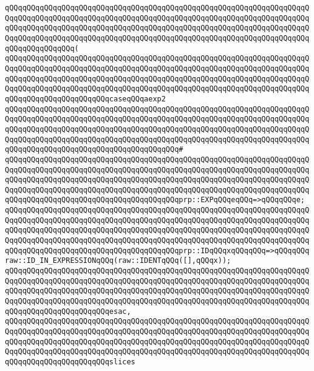\verb|qQQqqQQqqQQqqQQqqQQqqQQqqQQqqQQqqQQqqQQqqQQqqQQqqQQqqQQqqQQqqQQqqQQqqQQqqQQqqQQqqQQqqQQqqQQqqQQqqQQqqQQqqQQqqQQqqQQqqQQqqQQqqQQqqQQqqQQqqQQqqQQqqQQqqQQqqQQqqQQqqQQqqQQqqQQqqQQqqQQqqQQqqQQqqQQqqQQqqQQqqQQqqQQqqQQqqQQqqQQqqQQqqQQqqQQqqQQqqQQqqQQqqQQqqQQqqQQqqQQqqQQqqQQqqQQqqQQqqQQqqQQqqQQqqQQqqQQq(|\newline
\verb|qQQqqQQqqQQqqQQqqQQqqQQqqQQqqQQqqQQqqQQqqQQqqQQqqQQqqQQqqQQqqQQqqQQqqQQqqQQqqQQqqQQqqQQqqQQqqQQqqQQqqQQqqQQqqQQqqQQqqQQqqQQqqQQqqQQqqQQqqQQqqQQqqQQqqQQqqQQqqQQqqQQqqQQqqQQqqQQqqQQqqQQqqQQqqQQqqQQqqQQqqQQqqQQqqQQqqQQqqQQqqQQqqQQqqQQqqQQqqQQqqQQqqQQqqQQqqQQqqQQqqQQqqQQqqQQqqQQqqQQqqQQqqQQqqQQqqQQqqQQqqQQqcaseqQQqaexp2|\newline
\verb|qQQqqQQqqQQqqQQqqQQqqQQqqQQqqQQqqQQqqQQqqQQqqQQqqQQqqQQqqQQqqQQqqQQqqQQqqQQqqQQqqQQqqQQqqQQqqQQqqQQqqQQqqQQqqQQqqQQqqQQqqQQqqQQqqQQqqQQqqQQqqQQqqQQqqQQqqQQqqQQqqQQqqQQqqQQqqQQqqQQqqQQqqQQqqQQqqQQqqQQqqQQqqQQqqQQqqQQqqQQqqQQqqQQqqQQqqQQqqQQqqQQqqQQqqQQqqQQqqQQqqQQqqQQqqQQqqQQqqQQqqQQqqQQqqQQqqQQqqQQqqQQqqQQqqQQqqQQqqQQq#|\newline
\verb|qQQqqQQqqQQqqQQqqQQqqQQqqQQqqQQqqQQqqQQqqQQqqQQqqQQqqQQqqQQqqQQqqQQqqQQqqQQqqQQqqQQqqQQqqQQqqQQqqQQqqQQqqQQqqQQqqQQqqQQqqQQqqQQqqQQqqQQqqQQqqQQqqQQqqQQqqQQqqQQqqQQqqQQqqQQqqQQqqQQqqQQqqQQqqQQqqQQqqQQqqQQqqQQqqQQqqQQqqQQqqQQqqQQqqQQqqQQqqQQqqQQqqQQqqQQqqQQqqQQqqQQqqQQqqQQqqQQqqQQqqQQqqQQqqQQqqQQqqQQqqQQqqQQqqQQqqQQqqQQqprp::EXPqQQqeqQQq=>qQQqqQQqe;|\newline
\verb|qQQqqQQqqQQqqQQqqQQqqQQqqQQqqQQqqQQqqQQqqQQqqQQqqQQqqQQqqQQqqQQqqQQqqQQqqQQqqQQqqQQqqQQqqQQqqQQqqQQqqQQqqQQqqQQqqQQqqQQqqQQqqQQqqQQqqQQqqQQqqQQqqQQqqQQqqQQqqQQqqQQqqQQqqQQqqQQqqQQqqQQqqQQqqQQqqQQqqQQqqQQqqQQqqQQqqQQqqQQqqQQqqQQqqQQqqQQqqQQqqQQqqQQqqQQqqQQqqQQqqQQqqQQqqQQqqQQqqQQqqQQqqQQqqQQqqQQqqQQqqQQqqQQqqQQqqQQqqQQqprp::IDqQQqxqQQqqQQq=>qQQqqQQqraw::ID_IN_EXPRESSIONqQQq(raw::IDENTqQQq([],qQQqx));|\newline
\verb|qQQqqQQqqQQqqQQqqQQqqQQqqQQqqQQqqQQqqQQqqQQqqQQqqQQqqQQqqQQqqQQqqQQqqQQqqQQqqQQqqQQqqQQqqQQqqQQqqQQqqQQqqQQqqQQqqQQqqQQqqQQqqQQqqQQqqQQqqQQqqQQqqQQqqQQqqQQqqQQqqQQqqQQqqQQqqQQqqQQqqQQqqQQqqQQqqQQqqQQqqQQqqQQqqQQqqQQqqQQqqQQqqQQqqQQqqQQqqQQqqQQqqQQqqQQqqQQqqQQqqQQqqQQqqQQqqQQqqQQqqQQqqQQqqQQqqQQqqQQqqQQqesac,|\newline
\newline
\verb|qQQqqQQqqQQqqQQqqQQqqQQqqQQqqQQqqQQqqQQqqQQqqQQqqQQqqQQqqQQqqQQqqQQqqQQqqQQqqQQqqQQqqQQqqQQqqQQqqQQqqQQqqQQqqQQqqQQqqQQqqQQqqQQqqQQqqQQqqQQqqQQqqQQqqQQqqQQqqQQqqQQqqQQqqQQqqQQqqQQqqQQqqQQqqQQqqQQqqQQqqQQqqQQqqQQqqQQqqQQqqQQqqQQqqQQqqQQqqQQqqQQqqQQqqQQqqQQqqQQqqQQqqQQqqQQqqQQqqQQqqQQqqQQqqQQqqQQqqQQqqQQqslices|\newline
